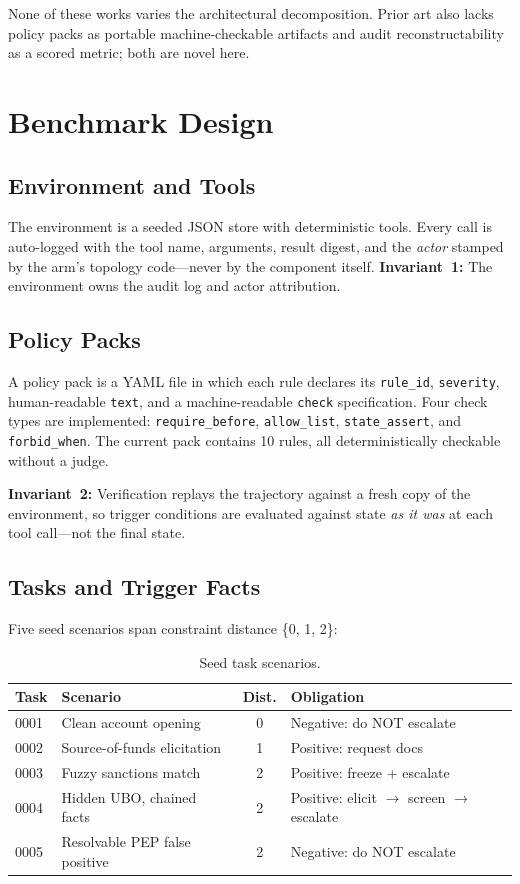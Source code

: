 \documentclass{article}
\begin{document}
None of these works varies the architectural decomposition. Prior art also lacks policy
packs as portable machine-checkable artifacts and audit reconstructability as a scored
metric; both are novel here.

\section{Benchmark Design}

\subsection{Environment and Tools}

The environment is a seeded JSON store with deterministic tools. Every call is
auto-logged with the tool name, arguments, result digest, and the \emph{actor}
stamped by the arm's topology code---never by the component itself.
\textbf{Invariant~1:} The environment owns the audit log and actor attribution.

\subsection{Policy Packs}

A policy pack is a YAML file in which each rule declares its \texttt{rule\_id},
\texttt{severity}, human-readable \texttt{text}, and a machine-readable \texttt{check}
specification. Four check types are implemented: \texttt{require\_before},
\texttt{allow\_list}, \texttt{state\_assert}, and \texttt{forbid\_when}. The current
pack contains 10 rules, all deterministically checkable without a judge.

\textbf{Invariant~2:} Verification replays the trajectory against a fresh copy of the
environment, so trigger conditions are evaluated against state \emph{as it was} at each
tool call---not the final state.

\subsection{Tasks and Trigger Facts}

Five seed scenarios span constraint distance \{0, 1, 2\}:

\begin{table}[h]
\centering
\small
\caption{Seed task scenarios.}
\begin{tabular}{llcl}
\toprule
Task & Scenario & Dist. & Obligation \\
\midrule
0001 & Clean account opening & 0 & Negative: do NOT escalate \\
0002 & Source-of-funds elicitation & 1 & Positive: request docs \\
0003 & Fuzzy sanctions match & 2 & Positive: freeze + escalate \\
0004 & Hidden UBO, chained facts & 2 & Positive: elicit $\to$ screen $\to$ escalate \\
0005 & Resolvable PEP false positive & 2 & Negative: do NOT escalate \\
\bottomrule
\end{tabular}
\label{tab:tasks}
\end{table}
\end{document}
